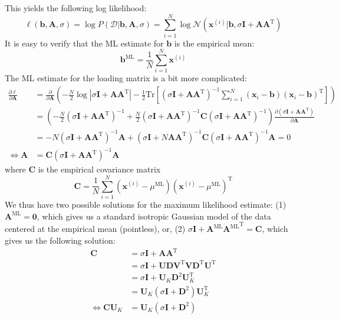 \documentclass[a4paper]{article}
\begin{document}
This yields the following log likelihood:
\[ \ell(\mathbf{b,A},\sigma) = \log P(\mathcal{D}|\mathbf{b,A},\sigma) = \sum_{i=1}^N\log\mathcal{N}\left(\mathbf{x}^{(i)}|\mathbf{b},\sigma \mathbf{I} + \mathbf{AA}^\textrm{T}\right) \]
It is easy to verify that the ML estimate for $\mathbf{b}$ is the empirical mean:
\[ \mathbf{b}^\textrm{ML} = \frac{1}{N}\sum_{i=1}^N \mathbf{x}^{(i)} \]
The ML estimate for the loading matrix is a bit more complicated:
\begin{align*}
\frac{\partial \ell}{\partial \mathbf{A}} &= \frac{\partial}{\partial \mathbf{A}}\left( -\frac{N}{2}\log |\sigma \mathbf{I} + \mathbf{AA}^\textrm{T}| - \frac{1}{2} \textrm{Tr}\left[ (\sigma \mathbf{I} + \mathbf{AA}^\textrm{T})^{-1} \sum_{i=1}^N (\mathbf{x}_i-\mathbf{b})(\mathbf{x}_i-\mathbf{b})^\textrm{T} \right]\right) \\
&= \left(-\frac{N}{2}(\sigma \mathbf{I} + \mathbf{AA}^\textrm{T})^{-1} + \frac{N}{2} (\sigma \mathbf{I} + \mathbf{AA}^\textrm{T})^{-1} \mathbf{C} (\sigma \mathbf{I} + \mathbf{AA}^\textrm{T})^{-1}\right) \frac{\partial (\sigma \mathbf{I} + \mathbf{AA}^\textrm{T})}{\partial \mathbf{A}} \\
&= -N(\sigma \mathbf{I} + \mathbf{AA}^\textrm{T})^{-1}\mathbf{A} + (\sigma \mathbf{I} + N\mathbf{AA}^\textrm{T})^{-1} \mathbf{C} (\sigma \mathbf{I} + \mathbf{AA}^\textrm{T})^{-1} \mathbf{A} = 0 \\
\Leftrightarrow \mathbf{A} &= \mathbf{C} (\sigma \mathbf{I} + \mathbf{AA}^\textrm{T})^{-1} \mathbf{A}
\end{align*}
where $\mathbf{C}$ is the empirical covariance matrix
\[\mathbf{C} = \frac{1}{N}\sum_{i=1}^N (\mathbf{x}^{(i)}-\mu^\textrm{ML})(\mathbf{x}^{(i)}-\mu^\textrm{ML})^\textrm{T} \]
We thus have two possible solutions for the maximum likelihood estimate: (1) $\mathbf{A}^\textrm{ML} = \mathbf{0}$, which gives us a standard isotropic Gaussian model of the data centered at the empirical mean (pointless), or, (2) $\sigma \mathbf{I} + {\mathbf{A}^\textrm{ML}\mathbf{A}^\textrm{ML}}^\textrm{T} = \mathbf{C}$, which gives us the following solution:
\begin{align*}
\mathbf{C} &= \sigma \mathbf{I} + \mathbf{A}\mathbf{A}^\textrm{T} \\
&= \sigma \mathbf{I} + \mathbf{UDV}^\textrm{T}\mathbf{VD}^\textrm{T}\mathbf{U}^\textrm{T} \\
&= \sigma \mathbf{I} + \mathbf{U}_K \mathbf{D}^2 \mathbf{U}_K^\textrm{T} \\
&= \mathbf{U}_K (\sigma \mathbf{I} + \mathbf{D}^2)\mathbf{U}_K^\textrm{T} \\
\Leftrightarrow \mathbf{C}\mathbf{U}_K &= \mathbf{U}_K (\sigma \mathbf{I} + \mathbf{D}^2)
\end{align*}
\end{document}
